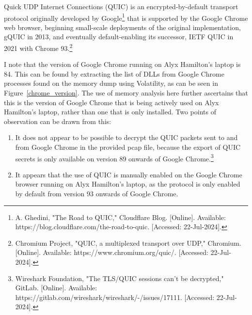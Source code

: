 \begin{myenum}
	\item Quick UDP Internet Connections (QUIC) is an encrypted-by-default transport protocol originally developed by Google\footnote{A. Ghedini, "The Road to QUIC," Cloudflare Blog. [Online]. Available: https://blog.cloudflare.com/the-road-to-quic. [Accessed: 22-Jul-2024].} that is supported by the Google Chrome web browser, beginning small-scale deployments of the original implementation, gQUIC in 2013, and eventually default-enabling its successor, IETF QUIC in 2021 with Chrome 93.\footnote{Chromium Project, "QUIC, a multiplexed transport over UDP," Chromium. [Online]. Available: https://www.chromium.org/quic/. [Accessed: 22-Jul-2024].}
	\item I note that the version of Google Chrome running on Alyx Hamilton's laptop is 84. This can be found by extracting the list of DLLs from Google Chrome processes found on the memory dump using Volatility, as can be seen in Figure~\ref{chrome_version}. The use of memory analysis here further ascertains that this is the version of Google Chrome that is being actively used on Alyx Hamilton's laptop, rather than one that is only installed.
	 Two points of observation can be drawn from this:
		\begin{enumerate}
			\item It does not appear to be possible to decrypt the QUIC packets sent to and from Google Chrome in the provided pcap file, because the export of QUIC secrets is only available on version 89 onwards of Google Chrome.\footnote{Wireshark Foundation, "The TLS/QUIC sessions can't be decrypted," GitLab. [Online]. Available: https://gitlab.com/wireshark/wireshark/-/issues/17111. [Accessed: 22-Jul-2024].}
			\item It appears that the use of QUIC is manually enabled on the Google Chrome browser running on Alyx Hamilton's laptop, as the protocol is only enabled by default from version 93 onwards of Google Chrome.
		\end{enumerate}
\end{myenum}

